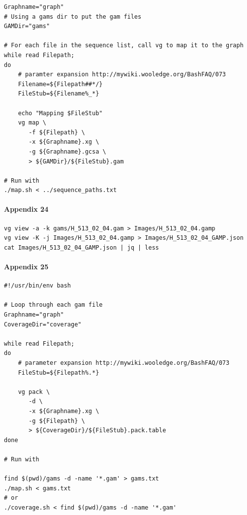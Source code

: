 \documentclass[10pt, a4paper]{article}
\begin{document}
\begin{appendices}
\begin{verbatim}
Graphname="graph"
# Using a gams dir to put the gam files
GAMDir="gams"

# For each file in the sequence list, call vg to map it to the graph
while read Filepath;
do
    # paramter expansion http://mywiki.wooledge.org/BashFAQ/073
    Filename=${Filepath##*/}
    FileStub=${Filename%_*}

    echo "Mapping $FileStub"
    vg map \
       -f ${Filepath} \
       -x ${Graphname}.xg \
       -g ${Graphname}.gcsa \
       > ${GAMDir}/${FileStub}.gam

# Run with
./map.sh < ../sequence_paths.txt
\end{verbatim}

\paragraph{Appendix 24}
\label{sec:org01760fd}
\begin{verbatim}
vg view -a -k gams/H_513_02_04.gam > Images/H_513_02_04.gamp
vg view -K -j Images/H_513_02_04.gamp > Images/H_513_02_04_GAMP.json
cat Images/H_513_02_04_GAMP.json | jq | less
\end{verbatim}

\paragraph{Appendix 25}
\label{sec:orgcf0041d}
\begin{verbatim}
#!/usr/bin/env bash

# Loop through each gam file
Graphname="graph"
CoverageDir="coverage"

while read Filepath;
do
    # parameter expansion http://mywiki.wooledge.org/BashFAQ/073
    FileStub=${Filepath%.*}

    vg pack \
       -d \
       -x ${Graphname}.xg \
       -g ${Filepath} \
       > ${CoverageDir}/${FileStub}.pack.table
done

# Run with

find $(pwd)/gams -d -name '*.gam' > gams.txt
./map.sh < gams.txt
# or
./coverage.sh < find $(pwd)/gams -d -name '*.gam'
\end{verbatim}

\end{appendices}
\end{document}
